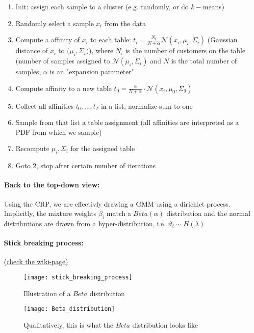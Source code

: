 \begin{enumerate}
    \item Init: assign each sample to a cluster (e.g. randomly, or do \(k-\)means)
    \item Randomly select a sample \(x_i\) from the data
    \item Compute a affinity of \(x_i\) to each table: \(t_i = \frac{N_i}{N+\alpha} \mathcal{N}(x_i, \mu_i, \Sigma_i)\) (Gaussian distance of \(x_i\) to \(\mathcal(\mu_i, \Sigma_i)\)), where \(N_i\) is the number of customers on the table (number of samples assigned to \(\mathcal{N}(\mu_i, \Sigma_i)\) and \(N\) is the total number of samples, \(\alpha\) is an "expansion parameter"
    \item Compute affinity to a new table \(t_0 = \frac{\alpha}{N + \alpha} \cdot \mathcal{N}(x_i, \mu_0, \Sigma_0)\)
    \item Collect all affinities \(t_0, \dots, t_T\) in a list, normalize sum to one
    \item Sample from that list a table assignment (all affinities are interpreted as a PDF from which we sample)
    \item Recompute \(\mu_i, \Sigma_i\) for the assigned table
    \item Goto 2, stop after certain number of iterations
\end{enumerate}

\paragraph{Back to the top-down view:}
Using the CRP, we are effectivly drawing a GMM using a dirichlet process. Implicitly, the mixture weights $\beta_i$ match a $Beta(\alpha)$ distribution and the normal distributions are drawn from a hyper-distribution, i.e. $\vartheta_i \sim H(\lambda)$

\paragraph{Stick breaking process:} \href{https://en.wikipedia.org/wiki/Dirichlet_process#The_stick-breaking_process}{(check the wiki-page)}
\begin{figure}[H]
  \centering
  \begin{minipage}[b]{0.49\textwidth}
    \texttt{[image: stick\_breaking\_process]}
    \caption{Illustration of a $Beta$ distribution}
  \end{minipage}
  \begin{minipage}[b]{0.49\textwidth}
    \texttt{[image: Beta\_distribution]}
    \caption{Qualitatively, this is what the $Beta$ distribution looks like}
  \end{minipage}
\end{figure}

